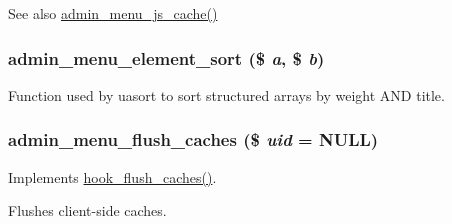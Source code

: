 \begin{DoxySeeAlso}{See also}
\hyperlink{admin__menu_8module_a199e7fc41af069dbf54a2e229cfec72b}{admin\_\-menu\_\-js\_\-cache()} 
\end{DoxySeeAlso}
\hypertarget{admin__menu_8module_a5be948b66b1a9aad706773c536a3f7ac}{
\subsubsection[{admin\_\-menu\_\-element\_\-sort}]{\setlength{\rightskip}{0pt plus 5cm}admin\_\-menu\_\-element\_\-sort (\$ {\em a}, \/  \$ {\em b})}}
\label{admin__menu_8module_a5be948b66b1a9aad706773c536a3f7ac}
Function used by uasort to sort structured arrays by weight AND title. \hypertarget{admin__menu_8module_a397aba2a3c508246b56d052faf29e9e4}{
\subsubsection[{admin\_\-menu\_\-flush\_\-caches}]{\setlength{\rightskip}{0pt plus 5cm}admin\_\-menu\_\-flush\_\-caches (\$ {\em uid} = {\ttfamily NULL})}}
\label{admin__menu_8module_a397aba2a3c508246b56d052faf29e9e4}
Implements \hyperlink{group__hooks_ga66531e6e564157b7ca45ed07549c9b97}{hook\_\-flush\_\-caches()}.

Flushes client-\/side caches.


